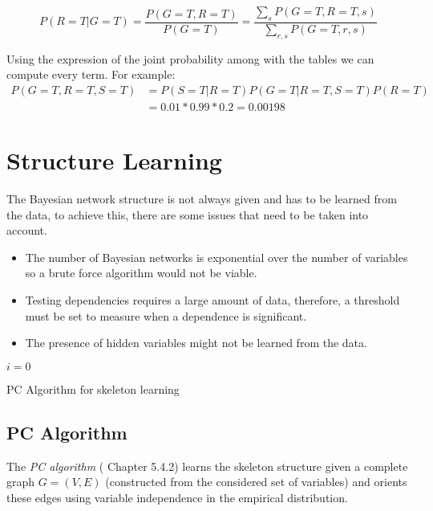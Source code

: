 \begin{exampleth}
\[
P(R = T | G = T) = \frac{P(G = T, R = T)}{P(G=T)} = \frac{\sum_{s}P(G=T, R=T,
s)}{\sum_{r,s} P(G=T, r, s)}
\]

Using the expression of the joint probability among with the tables we can
compute every term. For example:
\[
\begin{aligned}
P(G=T, R=T, S=T) &= P(S=T|R=T)P(G=T|R=T,S=T)P(R=T) \\
&= 0.01 * 0.99 * 0.2 = 0.00198
\end{aligned}
\]
\end{exampleth}

\section{Structure Learning}

The Bayesian network structure is not always given and has to be learned from the data, to achieve this, there are some issues that need to be taken into account.
\begin{itemize}\setlength{\itemsep}{0.15cm}
  \item The number of Bayesian networks is exponential over the number of variables so a brute force algorithm would not be viable.
  \item Testing dependencies requires a large amount of data, therefore, a threshold must be set to measure when a dependence is significant.
  \item The presence of hidden variables might not be learned from the data.
\end{itemize}


\begin{algorithm}[t]
  \SetAlgoLined{}
  \(i = 0\)\;
  \caption{PC Algorithm for skeleton learning}\label{alg:pc}
\end{algorithm}

\subsection{PC Algorithm}

The \emph{PC algorithm} (\cite{spirtes2000causation} Chapter 5.4.2) learns the skeleton structure given a complete graph \(G=(V,E)\) (constructed from the considered set of variables) and orients these edges using variable independence in the empirical distribution.

